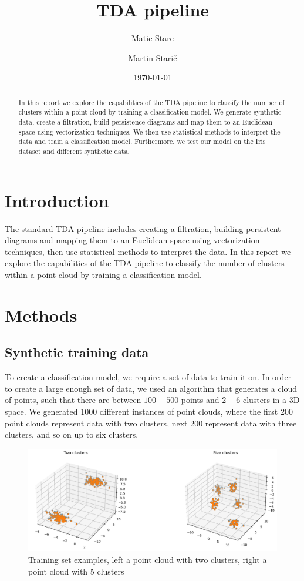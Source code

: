 \documentclass{article}
\title{TDA pipeline}
\author{
  Matic Stare
  \and
  Martin Starič
}
\date{\today}
\begin{document}
\maketitle

\tableofcontents
\newpage

\begin{abstract}
    In this report we explore the capabilities of the TDA pipeline to classify the number of clusters within a point cloud by training a classification model. We generate synthetic data, create a filtration, build persistence diagrams and map them to an Euclidean space using vectorization techniques. We then use statistical methods to interpret the data and train a classification model. Furthermore, we test our model on the Iris dataset and different synthetic data.
\end{abstract}

\section{Introduction}
The standard TDA pipeline includes creating a filtration, building persistent diagrams and mapping them to an Euclidean space using vectorization techniques, then use statistical methods to interpret the data. In this report we explore the capabilities of the TDA pipeline to classify the number of clusters within a point cloud by training a classification model.


\section{Methods}
\subsection{Synthetic training data}
To create a classification model, we require a set of data to train it on. In order to create a large enough set of data, we used an algorithm that generates a cloud of points, such that there are between $100-500$ points and $2-6$ clusters in a 3D space. We generated 1000 different instances of point clouds, where the first 200 point clouds represent data with two clusters, next 200 represent data with three clusters, and so on up to six clusters.

\begin{figure}[H]
    \centering
    \includegraphics[width=1\linewidth]{TrainingDataViz.png}
    \caption{Training set examples, left a point cloud with two clusters, right a point cloud with 5 clusters}
\end{figure}
\end{document}
